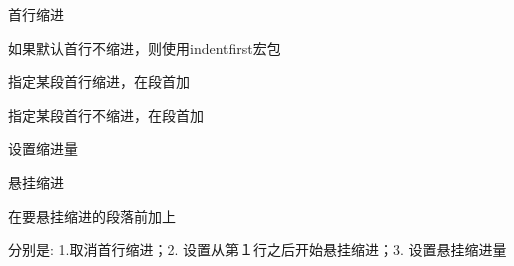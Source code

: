 \documentclass{article}
\begin{document}

\setlength{\parskip}{0.5\baselineskip}

首行缩进

如果默认首行不缩进，则使用indentfirst宏包


指定某段首行缩进，在段首加

\indent

指定某段首行不缩进，在段首加

\noindent

设置缩进量

\setlength\parindent{2em}

悬挂缩进

在要悬挂缩进的段落前加上

\noindent
{}
\setlength{\hangindent}{2em}

分别是: 1.取消首行缩进；2. 设置从第１行之后开始悬挂缩进；3. 设置悬挂缩进量
\end{document}

